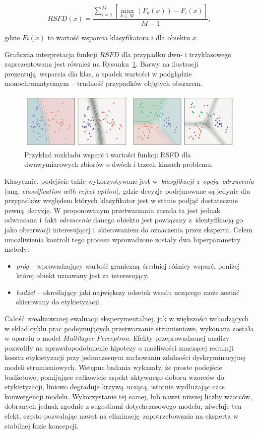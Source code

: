 \begin{equation}
	RSFD(x) = \frac{\sum_{i=1}^{M}[ \max_{k\in\mathcal{M}}(F_k(x)) - F_i(x)]}{M-1},
\end{equation}

\noindent gdzie $Fi(x)$ to wartość wsparcia klasyfikatora $i$ dla obiektu $x$. 

Graficzna interpretacja funkcji $RSFD$ dla przypadku dwu- i trzyklasowego zaprezentowana jest również na Rysunku~\ref{fig:neuro1}. Barwy na ilustracji prezentują wsparcia dla klas, a spadek wartości w podglądzie monochromatycznym -- trudność przypadków objętych obszarem.

\begin{figure}[!htb]
	\centering
	\includegraphics[width=\textwidth]{figures/neuro1}
	\caption{Przykład rozkładu wsparć i wartości funkcji RSFD dla dwuwymiarowych zbiorów o dwóch i trzech klasach problemu.}\label{fig:neuro1}
\end{figure}

Klasycznie, podejście takie wykorzystywane jest w~\emph{klasyfikacji z~opcją odrzucenia} (ang. \emph{classification with reject option}), gdzie decyzje podejmowane są jedynie dla przypadków względem których klasyfikator jest w stanie podjąć dostatecznie pewną decyzję. W proponowanym przetwarzaniu zasada ta jest jednak odwracana i~fakt \emph{odrzucenia} danego obiektu jest powiązany z~identyfikacją go jako obserwacji interesującej i~skierowaniem do oznaczenia przez eksperta. Celem umożliwienia kontroli tego procesu wprowadzone zostały dwa hiperparametry metody:

\begin{itemize}
	\item \emph{próg} -- wprowadzający wartość graniczną średniej różnicy wsparć, poniżej której obiekt uznawany jest za interesujący,
	\item \emph{budżet} -- określający jaki największy odsetek wsadu uczącego może zostać skierowany do etykietyzacji.
\end{itemize}

Całość zrealizowanej ewaluacji eksperymentalnej, jak w większości wchodzących w skład cyklu prac podejmujących przetwarzanie strumieniowe, wykonana została w oparciu o model \emph{Multilayer Perceptron}. Efekty przeprowadzonej analizy pozwoliły na uprawdopodobnienie hipotezy o możliwości znaczącej redukcji kosztu etykietyzacji przy jednoczesnym zachowaniu zdolności dyskryminacyjnej modeli strumieniowych. Wstępne badania wykazały, że proste podejście budżetowe, pomijające całkowicie aspekt aktywnego doboru wzorców do etykietyzacji, liniowo degraduje krzywą uczącą, istotnie wydłużając czas konwergencji modelu. Wykorzystanie tej samej, lub nawet niższej liczby wzorców, dobranych jednak zgodnie z sugestiami dotychczasowego modelu, niweluje ten efekt, często pozwalając nawet na eliminację zapotrzebowania na eksperta w stabilnej fazie koncepcji. 

